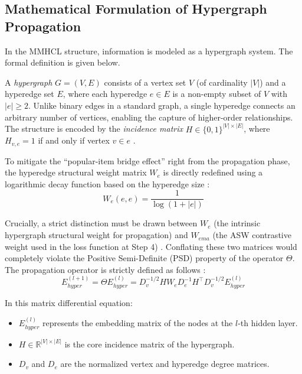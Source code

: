     \subsection{Mathematical Formulation of Hypergraph Propagation}
    
    In the MMHCL structure, information is modeled as a hypergraph system. The formal definition is given below.
    
    \begin{definition}
    \label{def:hypergraph}
    A \emph{hypergraph} $G = (V, E)$ consists of a vertex set $V$ (of cardinality $|V|$) and a hyperedge set $E$, where each hyperedge $e \in E$ is a non-empty subset of $V$ with $|e| \ge 2$. Unlike binary edges in a standard graph, a single hyperedge connects an arbitrary number of vertices, enabling the capture of higher-order relationships. The structure is encoded by the \emph{incidence matrix} $H \in \{0,1\}^{|V|\times|E|}$, where $H_{v,e} = 1$ if and only if vertex $v \in e$ \cite{zhou2006hypergraphs, han2025biviewhypergraph}.
    \end{definition}
    
    To mitigate the ``popular-item bridge effect'' right from the propagation phase, the hyperedge structural weight matrix $W_e$ is directly redefined using a logarithmic decay function based on the hyperedge size \cite{raj2025unlockingmultimodal}:
    \begin{equation}\label{eq:We}
    W_e(e,e) = \frac{1}{\log(1 + |e|)}
    \end{equation}
    
    Crucially, a strict distinction must be drawn between $W_e$ (the intrinsic hypergraph structural weight for propagation) and $W_{ema}$ (the ASW contrastive weight used in the loss function at Step 4) \cite{guo2025mmhcl, feng2025nlgcl}. Conflating these two matrices would completely violate the Positive Semi-Definite (PSD) property of the operator $\Theta$. The propagation operator is strictly defined as follows \cite{zhang2020hypergraphsignalprocessing, ma2025particlesystemhypergraph}:
    \begin{equation}\label{eq:hyperprop}
    E_{hyper}^{(l+1)} = \Theta E_{hyper}^{(l)} = D_v^{-1/2} H W_e D_e^{-1} H^{\top} D_v^{-1/2} E_{hyper}^{(l)}
    \end{equation}
    
    In this matrix differential equation:
    \begin{itemize}
        \item $E_{hyper}^{(l)}$ represents the embedding matrix of the nodes at the $l$-th hidden layer.
        \item $H \in \mathbb{R}^{|V| \times |E|}$ is the core incidence matrix of the hypergraph.
        \item $D_v$ and $D_e$ are the normalized vertex and hyperedge degree matrices.
    \end{itemize}
    
